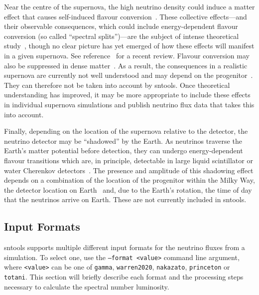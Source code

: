 \documentclass[11pt, oneside]{article}
\begin{document}
Near the centre of the supernova, the high neutrino density could induce a matter effect that causes self-induced flavour conversion~\cite{Duan2006a,Duan2006}.
These collective effects---and their observable consequences, which could include energy-dependent flavour conversion (so called “spectral splits”)---are the subject of intense theoretical study~\cite{Raffelt2007,Dasgupta2009,Friedland2010,Duan2011,Izaguirre2017}, though no clear picture has yet emerged of how these effects will manifest in a given supernova.
See reference~\cite{Chakraborty2016} for a recent review.
Flavour conversion may also be suppressed in dense matter~\cite{Esteban-Pretel2008,Zaizen2018}.
As a result, the consequences in a realistic supernova are currently not well understood and may depend on the progenitor~\cite{Chakraborty2014}.
They can therefore not be taken into account by sntools.
Once theoretical understanding has improved, it may be more appropriate to include these effects in individual supernova simulations and publish neutrino flux data that takes this into account.

Finally, depending on the location of the supernova relative to the detector, the neutrino detector may be “shadowed” by the Earth.
As neutrinos traverse the Earth’s matter potential before detection, they can undergo energy-dependent flavour transitions which are, in principle, detectable in large liquid scintillator or water Cherenkov detectors~\cite{Dighe2003}.
The presence and amplitude of this shadowing effect depends on a combination of the location of the progenitor within the Milky Way, the detector location on Earth~\cite{Mirizzi2006} and, due to the Earth’s rotation, the time of day that the neutrinos arrive on Earth.
These are not currently included in sntools.%


\subsection{Input Formats} \label{sec:input-formats}
sntools supports multiple different input formats for the neutrino fluxes from a simulation.
To select one, use the \texttt{--format <value>} command line argument, where \texttt{<value>} can be one of \texttt{gamma}, \texttt{warren2020}, \texttt{nakazato}, \texttt{princeton} or \texttt{totani}.
This section will briefly describe each format and the processing steps necessary to calculate the spectral number luminosity.
\end{document}
